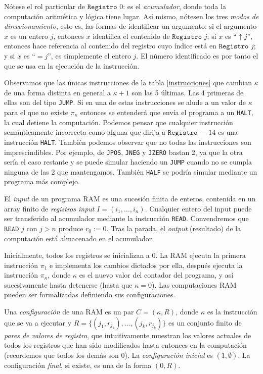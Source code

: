 \documentclass[twoside]{article}
\begin{document}
Nótese el rol particular de $\texttt{Registro }0$: es el \emph{acumulador}, donde toda la computación aritmética y lógica tiene lugar. Así mismo, nótesen los tres \emph{modos de direccionamiento}, esto es, las formas de identificar un argumento: si el argumento $x$ es un entero $j$, entonces $x$ identifica el contenido de $\texttt{Registro }j$; si $x$ es ``$\uparrow j$'', entonces hace referencia al contenido del registro cuyo índice está en $\texttt{Registro }j$; y si $x$ es ``$=j$'', es simplemente el entero $j$. El número identificado es por tanto el que se usa en la ejecución de la instrucción.

Observamos que las únicas instrucciones de la tabla \ref{instrucciones} que cambian $\kappa$ de una forma distinta en general a $\kappa+1$ son las 5 últimas. Las 4 primeras de ellas son del tipo \texttt{JUMP}. Si en una de estas instrucciones se alude a un valor de $\kappa$ para el que no existe $\pi_\kappa$ entonces se entenderá que envía el programa a un \texttt{HALT}, la cual detiene la computación. Podemos pensar que cualquier instrucción semánticamente incorrecta como alguna que dirija a $\texttt{Registro }-14$ es una instrucción \texttt{HALT}.  También podemos observar que no todas las instrucciones son imprescindibles. Por ejemplo, de \texttt{JPOS}, \texttt{JNEG} y \texttt{JZERO} bastan 2, ya que la otra sería el caso restante y se puede simular haciendo un \texttt{JUMP} cuando no se cumpla ninguna de las 2 que mantengamos. También \texttt{HALF} se podría simular mediante un programa más complejo.

\begin{defi}
El \emph{input} de un programa RAM es una sucesión finita de enteros, contenida en un array finito de \emph{registros input} $I=(i_1,\dots,i_n)$. Cualquier entero del input puede ser transferido al acumulador mediante la instrucción \texttt{READ}. Convendremos que $\texttt{READ }j$ con $j>n$ produce $r_0:=0$. Tras la parada, el \emph{output} (resultado) de la computación está almacenado en el acumulador. 
\end{defi}


Inicialmente, todos los registros se inicializan a 0. La RAM ejecuta la primera instrucción $\pi_1$ e implementa los cambios dictados por ella, después ejecuta la instrucción $\pi_\kappa$, donde $\kappa$ es el nuevo valor del contador del programa, y así sucesivamente hasta detenerse (hasta que $\kappa=0$). Las computaciones RAM pueden ser formalizadas definiendo sus configuraciones.
\begin{defi}
Una \emph{configuración} de una RAM es un par $C=(\kappa,R)$, donde $\kappa$ es la instrucción que se va a ejecutar y $R=\{(j_1,r_{j_1}),\dots,(j_k,r_{j_k})\}$ es un conjunto finito de \emph{pares de valores de registro}, que intuitivamente muestran los valores actuales de todos los registros que han sido modificados hasta entonces en la computación (recordemos que todos los demás son 0). La \emph{configuración inicial} es $(1,\emptyset)$. La configuración \emph{final}, si existe, es una de la forma $(0,R)$. 
\end{defi}
\end{document}
